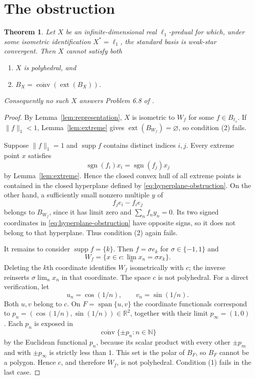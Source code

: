 \documentclass[11pt]{article}
\newtheorem{theorem}{Theorem}
\newcommand{\R}{\mathbb R}
\newcommand{\ext}{\operatorname{ext}}
\newcommand{\cconv}{\overline{\operatorname{conv}}}
\begin{document}
\section{The obstruction}

\begin{theorem}\label{thm:main}
Let $X$ be an infinite-dimensional real $\ell_1$-predual for which, under
some isometric identification $X^*=\ell_1$, the standard basis is weak-star
convergent. Then $X$ cannot satisfy both
\begin{enumerate}
\item $X$ is polyhedral, and
\item $B_X=\cconv(\ext(B_X))$.
\end{enumerate}
Consequently no such $X$ answers Problem 6.8 of \cite{DeBernardi}.
\end{theorem}

\begin{proof}
By Lemma~\ref{lem:representation}, $X$ is isometric to $W_f$ for some
$f\in B_{\ell_1}$. If $\|f\|_1<1$, Lemma~\ref{lem:extreme} gives
$\ext(B_{W_f})=\varnothing$, so condition (2) fails.

Suppose $\|f\|_1=1$ and $\operatorname{supp}f$ contains distinct indices
$i,j$. Every extreme point $x$ satisfies
\begin{equation}\label{eq:hyperplane-obstruction}
 \operatorname{sgn}(f_i)x_i=\operatorname{sgn}(f_j)x_j
\end{equation}
by Lemma~\ref{lem:extreme}. Hence the closed convex hull of all extreme
points is contained in the closed hyperplane defined by
\eqref{eq:hyperplane-obstruction}. On the other hand, a sufficiently small
nonzero multiple $y$ of
\[
                         f_je_i-f_ie_j
\]
belongs to $B_{W_f}$, since it has limit zero and $\sum_nf_ny_n=0$.
Its two signed coordinates in \eqref{eq:hyperplane-obstruction} have
opposite signs, so it does not belong to that hyperplane. Thus condition (2)
again fails.

It remains to consider $\operatorname{supp}f=\{k\}$. Then
$f=\sigma e_k$ for $\sigma\in\{-1,1\}$ and
\[
                   W_f=\{x\in c:\lim_nx_n=\sigma x_k\}.
\]
Deleting the $k$th coordinate identifies $W_f$ isometrically with $c$; the
inverse reinserts $\sigma\lim_nx_n$ in that coordinate. The space $c$ is not
polyhedral. For a direct verification, let
\[
 u_n=\cos(1/n),\qquad v_n=\sin(1/n).
\]
Both $u,v$ belong to $c$. On $F=\operatorname{span}\{u,v\}$ the coordinate
functionals correspond to
$p_n=(\cos(1/n),\sin(1/n))\in\R^2$, together with their limit
$p_\infty=(1,0)$. Each $p_n$ is exposed in
\[
       \cconv\{\pm p_n:n\in\mathbb N\}
\]
by the Euclidean functional $p_n$, because its scalar product with every
other $\pm p_m$ and with $\pm p_\infty$ is strictly less than $1$. This set
is the polar of $B_F$, so $B_F$ cannot be a polygon. Hence $c$, and therefore
$W_f$, is not polyhedral. Condition (1) fails in the last case.
\end{proof}
\end{document}
